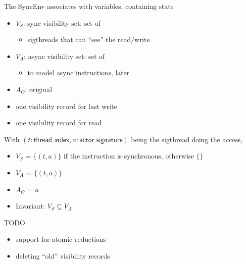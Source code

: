 \begin{minipage}[t]{0.48\textwidth}\fixminipage
The SyncEnv associates  with variables, containing state
\begin{itemize}
  \item $V_S$: sync visibility set: set of 
  \begin{itemize}
    \item sigthreads that can ``see'' the read/write
  \end{itemize}
  \item $V_A$: async visibility set: set of 
  \begin{itemize}
    \item to model async instructions, later
  \end{itemize}
  \item $A_O$: original 
\end{itemize}

\begin{itemize}
  \item one  visibility record for last write
  \item one  visibility record for  read
\end{itemize}

With $(t: \mathsf{thread\_index}, a: \mathsf{actor\_signature})$ being the sigthread doing the access, 
\begin{itemize}
  \item $V_S$ = $\{(t,a)\}$ if the instruction is synchronous, otherwise $\{\}$
  \item $V_A$ = $\{(t,a)\}$
  \item $A_O$ = $a$
  \item Invariant: $V_S \subseteq V_A$
\end{itemize}
TODO
\begin{itemize}
  \item support for atomic reductions
  \item deleting ``old'' visibility records
\end{itemize}
\end{minipage}
\hfill
